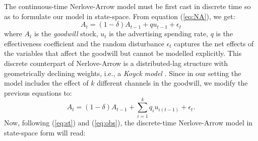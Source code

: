 The continuous-time Nerlove-Arrow model must be first cast in discrete time so as to formulate our model in state-space. From equation (\ref{eq:NA}), we get:
$$
A_t =  (1-\delta) A_{t-1} + q u_{t-1} + \epsilon_t 
$$
where $A_t$ is the \emph{goodwill} stock, $u_t$ is the advertising spending rate, $q$ is the effectiveness coefficient and the random disturbance $\epsilon_t$  captures the net effects of the variables that affect the goodwill  but cannot be modelled explicitly.  This discrete counterpart of Nerlove-Arrow is a distributed-lag structure with geometrically declining weights, i.e., a \emph{Koyck model} \parencite{clarke1976econometric, koyck1954distributed}. Since in our setting the model includes the effect of $k$ different channels in the goodwill, we modify the previous equations to:
$$
A_t =  (1-\delta) A_{t-1} + \sum_{i=1}^k q_i u_{i(t-1)} + \epsilon_t.
$$
Now, following  (\ref{eq:st}) and (\ref{eq:obs}), the discrete-time Nerlove-Arrow model in state-space form will read:
